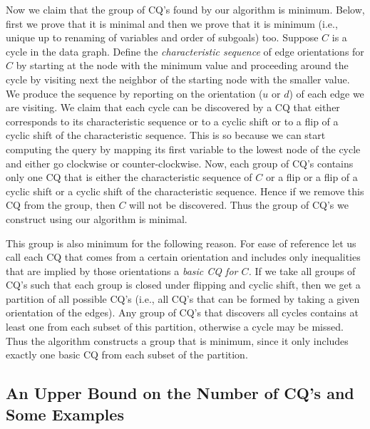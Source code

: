 Now we claim that the group of CQ's found by our algorithm is minimum.
Below, first we prove that it is minimal and then we prove that it is minimum (i.e., unique up to renaming of variables and order of subgoals) too.
Suppose $C$ is a cycle in the data graph.  Define the {\em characteristic sequence} of edge orientations for $C$ by starting at the node with the minimum
value and proceeding around the cycle by visiting next the neighbor of the starting node
with the smaller value. We produce the sequence by reporting
on the orientation ($u$ or $d$) of each edge we are visiting. We claim that each cycle
can be discovered by a CQ that either corresponds to its characteristic sequence
or to a cyclic shift or to a flip of a cyclic shift of the characteristic sequence.
This is so because we can start computing the query by mapping its first variable
to the lowest node of the cycle and either go clockwise or counter-clockwise.
Now, each group of CQ's contains only one CQ that is either the characteristic sequence
of $C$ or a flip or a flip of a cyclic shift or a cyclic shift of the characteristic sequence. Hence if we remove this CQ from the group, then $C$ will not be
discovered. Thus the group of CQ's we construct using our algorithm is minimal.

This group is also minimum for the following reason.
For ease of reference let us call each CQ that comes from a certain orientation and includes only inequalities
that are implied by those orientations a {\em basic CQ for $C$.}
If we take all groups of CQ's such that each group is closed
under flipping and cyclic shift, then we get a partition of all possible CQ's (i.e., all CQ's that can be formed
by taking a given orientation of the edges). Any group of CQ's that discovers all cycles
contains at least one from each subset of this partition, otherwise a cycle may be missed.
Thus the algorithm constructs a group that is minimum, since it only includes exactly one basic CQ from each subset of the partition.


\subsection{An Upper Bound on the Number of CQ's and Some Examples}

